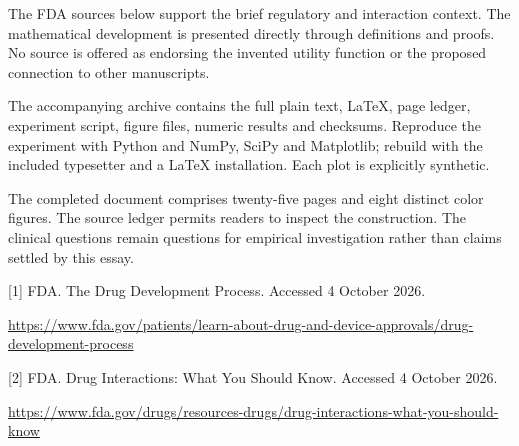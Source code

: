 \documentclass[10pt]{article}
\begin{document}
The FDA sources below support the brief regulatory and interaction context. The mathematical development is presented directly through definitions and proofs. No source is offered as endorsing the invented utility function or the proposed connection to other manuscripts.\par
The accompanying archive contains the full plain text, LaTeX, page ledger, experiment script, figure files, numeric results and checksums. Reproduce the experiment with Python and NumPy, SciPy and Matplotlib; rebuild with the included typesetter and a LaTeX installation. Each plot is explicitly synthetic.\par
The completed document comprises twenty-five pages and eight distinct color figures. The source ledger permits readers to inspect the construction. The clinical questions remain questions for empirical investigation rather than claims settled by this essay.\par
{\small [1] FDA. The Drug Development Process. Accessed 4 October 2026.\par\url{https://www.fda.gov/patients/learn-about-drug-and-device-approvals/drug-development-process}\par}
{\small [2] FDA. Drug Interactions: What You Should Know. Accessed 4 October 2026.\par\url{https://www.fda.gov/drugs/resources-drugs/drug-interactions-what-you-should-know}\par}
\end{document}
